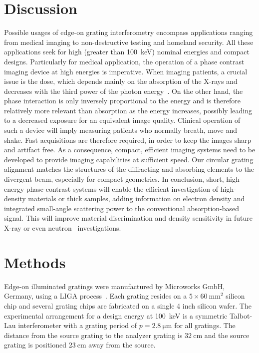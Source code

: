 \section{Discussion}
Possible usages of edge-on grating interferometry encompass applications
ranging from medical imaging to non-destructive testing and homeland
security. All these applications seek for high (greater than
\SI{100}{\kilo\eV}) nominal energies
and compact designs. Particularly for medical application, the operation of
a phase contrast imaging device at high energies is imperative. When imaging
patients, a crucial issue is the dose, which depends mainly on the
absorption of the X-rays and decreases with the third power of the photon
energy~\parencite{Momose2005}. On the other hand, the phase interaction is only inversely
proportional to the energy and is therefore relatively more relevant
than absorption as the energy increases, possibly leading to a decreased
exposure for an equivalent image quality. Clinical operation of such a
device will imply measuring patients who normally breath, move and shake.
Fast acquisitions are therefore required, in order to keep the images sharp
and artifact free. As a consequence, compact, efficient imaging systems need
to be developed to provide imaging capabilities at sufficient speed. Our
circular grating alignment matches the structures of the diffracting and
absorbing elements to the divergent beam, especially for compact geometries.
In conclusion, short, high-energy phase-contrast systems will enable the
efficient investigation of high-density materials or thick samples, adding
information on electron density and integrated small-angle scattering power
to the conventional absorption-based signal. This will improve material
discrimination and density sensitivity in future X-ray or even
neutron~\parencite{Grunzweig2008} investigations.

\section{Methods}
Edge-on illuminated gratings were manufactured by Microworks GmbH, Germany, using a LIGA process~\parencite{Kenntner2010}. Each grating
resides on a $5 \times \SI{60}{\milli\metre^2}$ silicon chip and several
grating chips are fabricated on a single 4 inch silicon wafer. The
experimental arrangement for a design energy at \SI{100}{\kilo\electronvolt}
is a symmetric Talbot-Lau interferometer with a grating period of $p =
\SI{2.8}{\micro \metre}$ for all gratings. The distance from the source
grating to the analyzer grating is $\SI{32}{\centi\metre}$ and the source
grating is positioned $\SI{23}{\centi\metre}$ away from the source.

